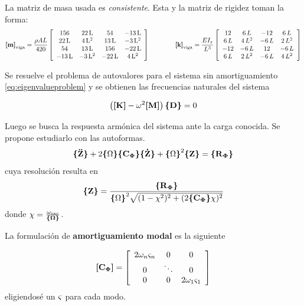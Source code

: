 \documentclass[onecolumn,10pt,titlepage,a4paper]{article}
\begin{document}
La matriz de masa usada es \textit{consistente}. Esta y la matriz de rigidez toman la forma: \cite[p.379]{cook2007concepts}
\[
\boldsymbol{[}\mathbf{m} \boldsymbol{]}_{\mathrm{viga}}=\frac{\rho A L}{420}\left[\begin{array}{cccc} 156 & 22\,\mathrm{L} & 54 & -13\,\mathrm{L}\\ 22\,\mathrm{L} & 4\,{\mathrm{L}}^2 & 13\,\mathrm{L} & -3\,{\mathrm{L}}^2\\ 54 & 13\,\mathrm{L} & 156 & -22\,\mathrm{L}\\ -13\,\mathrm{L} & -3\,{\mathrm{L}}^2 & -22\,\mathrm{L} & 4\,{\mathrm{L}}^2 \end{array}\right] \qquad \qquad \boldsymbol{[}\mathbf{k} \boldsymbol{]}_{\mathrm{viga}}=\frac{E I_z}{L^3} \left[\begin{array}{cccc} 12 & 6\,L & -12 & 6\,L\\ 6\,L & 4\,L^2 & -6\,L & 2\,L^2\\ -12 & -6\,L & 12 & -6\,L\\ 6\,L & 2\,L^2 & -6\,L & 4\,L^2 \end{array}\right]
\]

Se resuelve el problema de autovalores para el sistema sin amortiguamiento \eqref{eq:eigenvalueproblem} y se obtienen las frecuencias naturales del sistema 

\begin{equation} \label{eq:eigenvalueproblem}
	\left( \boldsymbol{[}\mathbf{K} \boldsymbol{]} - \omega^2 \boldsymbol{[}\mathbf{M} \boldsymbol{]}\right)\boldsymbol{\{ }\mathbf{D} \boldsymbol{\}}= 0
\end{equation}

Luego se busca la respuesta armónica del sistema ante la carga conocida. Se propone estudiarlo con las autoformas.
\begin{equation} \label{eq:Zmodal}
	 \boldsymbol{\{ }\mathbf{\boldsymbol{\ddot{\mathrm{Z}}}} \boldsymbol{\}}+2\boldsymbol{\{ } \Omega \boldsymbol{\} } \boldsymbol{\{ }\mathbf{C{_{\boldsymbol{\Phi}}}} \boldsymbol{\}} \boldsymbol{\{ }\mathbf{\boldsymbol{\dot{\mathrm{Z}}}} \boldsymbol{\}} + \boldsymbol{\{ } \Omega \boldsymbol{\} }^2 \boldsymbol{\{ }\mathbf{Z} \boldsymbol{\}} = \boldsymbol{\{ }\mathbf{R{_{\boldsymbol{\Phi}}}} \boldsymbol{\}}
\end{equation}
cuya resolución resulta en 
\begin{equation}
	\boldsymbol{\{ }\mathbf{Z} \boldsymbol{\}} = \frac{\boldsymbol{\{ }\mathbf{R{_{\boldsymbol{\Phi}}} } \boldsymbol{\}}}{{\boldsymbol{\{ } \Omega \boldsymbol{\} }}^2 \sqrt{(1-\chi^2)^2 + (2 \boldsymbol{\{ }\mathbf{C{_{\boldsymbol{\Phi}}}} \boldsymbol{\}} \chi)^2}}
\end{equation}
donde $\chi = \frac{\omega_{\mathrm{exc}}}{\boldsymbol{\{ }\mathbf{\Omega} \boldsymbol{\}}}$.

La formulación de \textbf{amortiguamiento modal} es la siguiente

\begin{equation}
\boldsymbol{[}\mathbf{C{_{\boldsymbol{\Phi}}}} \boldsymbol{]}=\left[ \begin{array}{ccc}{2 \omega_{n} \varsigma_{n}} & {0} & {0} \\ {0} & {\ddots} & {0} \\ {0} & {0} & {2 \omega_{1} \varsigma_{1}}\end{array}\right]
\end{equation}
eligiendosé un $\varsigma$ para cada modo.
\end{document}
